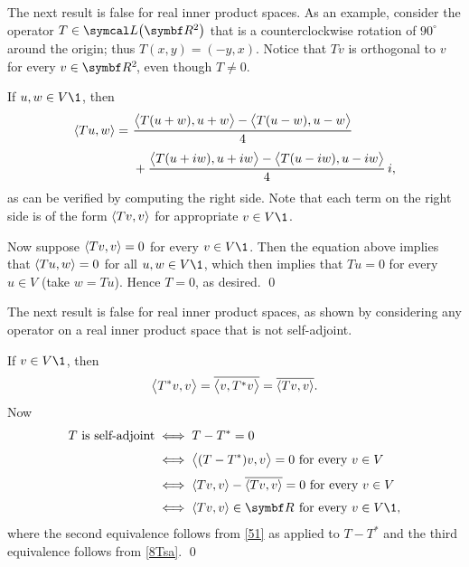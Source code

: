 \pagebreak[3]

The next result is false for real inner product spaces.  As an example,
consider the operator $T \in \L\paren[\big]{\R{2}}$ that is a counterclockwise rotation
of $90^\circ$ around the origin; thus $T(x, y) = (-y, x)$.  Notice that $Tv$ is
orthogonal to $v$ for every \mbox{$v \in \RR{2}$}, even though $T \ne 0$.


\proof
If $u, w \in V\1$, then
\begin{align*}
\ip{Tu, w} =\ &\frac{\ip[\big]{T(u+w), u + w} - \ip[\big]{T(u-w), u - w}}{4} \\[3bp]
&+ \frac{\ip[\big]{T(u+iw), u+iw}- \ip[\big]{T(u-iw), u - iw}}{4} \,  i,
\end{align*}
as can be verified by computing the right side.  Note that each term on the right side is of the form $\ip{Tv, v}$ for appropriate
$v \in V\1$.

Now suppose $\ip{Tv, v} = 0$ for every $v \in V\1$. Then the equation above implies that $\ip{Tu, w} = 0$ for all $u, w \in V\1$, which then implies that $Tu = 0$ for every $u \in V$ (take $w = Tu$). Hence $T = 0$, as desired.
\qed


The next result is false for real inner product spaces, as
shown by considering any operator on a real inner product space that
is not self-adjoint.


\proof
If $v \in V\1$, then
\begin{equation} \label{8Tsa}
\ip[\big]{T^*v, v} = \overline{\ip[\big]{v, T^*v}} = \overline{\ip{Tv, v}}.
\end{equation}
Now
\begin{align*}
T \text{ is self-adjoint} &\iff T - T^* = 0 \\[3bp]
&\iff \ip[\big]{ (T - T^*)v, v} = 0 \text{ for every } v \in V \\[3bp]
&\iff \ip{Tv, v} - \overline{\ip{Tv, v}} = 0  \text{ for every } v \in V \\[3bp]
&\iff \ip{Tv, v} \in \R{}  \text{ for every } v \in V\1,
\end{align*}
where the second equivalence follows from \ref{51} as applied to $T - T^*$ and the third equivalence follows from \ref{8Tsa}.
\qed

